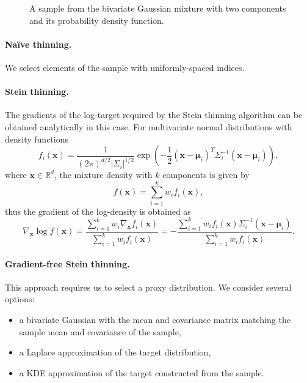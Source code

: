 \documentclass[11pt,a4paper]{report}
\begin{document}
\begin{figure}[h]
\centering
{}
\caption{A sample from the bivariate Gaussian mixture with two components and its probability density function.
\label{fig:gmm:sample}}
\end{figure}

\paragraph{Na\"ive thinning.} We select elements of the sample with uniformly-spaced indices.

\paragraph{Stein thinning.} The gradients of the log-target required by the Stein thinning algorithm can be obtained analytically in this case. For multivariate normal distributions with density functions
$$f_i(\mathbf{x}) = \frac{1}{(2\pi)^{d/2} |\Sigma_i|^{1/2}}\exp\left(-\frac{1}{2}(\mathbf{x} - \pmb{\mu}_i)^T \Sigma_i^{-1}(\mathbf{x}-\pmb{\mu}_i)\right),$$
where $\mathbf{x} \in \mathbb{R}^d$, the mixture density with $k$ components is given by
$$f(\mathbf{x}) = \sum_{i=1}^k w_i f_i(\mathbf{x}),$$
thus the gradient of the log-density is obtained as
$$\nabla_{\mathbf{x}} \log f(\mathbf{x}) = \frac{\sum_{i=1}^k w_i \nabla_{\mathbf{x}} f_i(\mathbf{x})}{\sum_{i=1}^k w_i f_i(\mathbf{x})} = -\frac{\sum_{i=1}^k w_i f_i(\mathbf{x}) \Sigma_i^{-1}(\mathbf{x} - \pmb{\mu}_i)}{\sum_{i=1}^k w_i f_i(\mathbf{x})}.$$

\paragraph{Gradient-free Stein thinning.} This approach requires us to select a proxy distribution. We consider several options:
\begin{itemize}
\item a bivariate Gaussian with the mean and covariance matrix matching the sample mean and covariance of the sample,
\item a Laplace approximation of the target distribution,
\item a KDE approximation of the target constructed from the sample.
\end{itemize}
\end{document}

